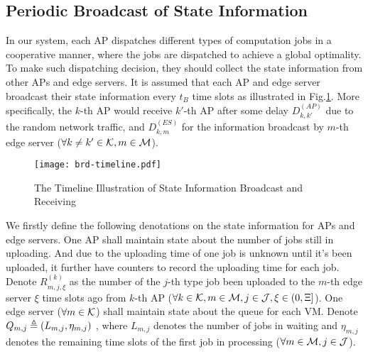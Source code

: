 
\subsection{Periodic Broadcast of State Information}
In our system, each AP dispatches different types of computation jobs in a cooperative manner, where the jobs are dispatched to achieve a global optimality.
To make such dispatching decision, they should collect the state information from other APs and edge servers.
It is assumed that each AP and edge server broadcast their state information every $t_B$ time slots as illustrated in Fig.\ref{fig:brd-timeline}.
More specifically, the $k$-th AP would receive $k'$-th AP after some delay $D^{(AP)}_{k,k'}$ due to the random network traffic, and $D^{(ES)}_{k,m}$ for the information broadcast by $m$-th edge server ($\forall k \neq k'\in\mathcal{K}, m\in\mathcal{M}$).
\begin{figure}[ht]
    \centering
    \texttt{[image: brd-timeline.pdf]}
    \caption{The Timeline Illustration of State Information Broadcast and Receiving}
    \label{fig:brd-timeline}
\end{figure}

We firstly define the following denotations on the state information for APs and edge servers.
One AP shall maintain state about the number of jobs still in uploading. 
And due to the uploading time of one job is unknown until it's been uploaded, it further have counters to record the uploading time for each job.
Denote $R^{(k)}_{m,j,\xi}$ as the number of the $j$-th type job been uploaded to the $m$-th edge server $\xi$ time slots ago from $k$-th AP ($\forall k\in\mathcal{K}, m\in\mathcal{M}, j\in\mathcal{J}, \xi\in(0,\Xi]$).
%
One edge server ($\forall m\in\mathcal{K}$) shall maintain state about the queue for each VM.
Denote $Q_{m,j} \triangleq (L_{m,j}, \eta_{m,j})$ , where $L_{m,j}$ denotes the number of jobs in waiting and $\eta_{m,j}$ denotes the remaining time slots of the first job in processing ($\forall m\in\mathcal{M}, j\in\mathcal{J}$). 


